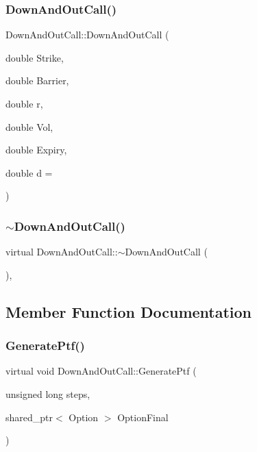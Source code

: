 \subsubsection{\texorpdfstring{Down\+And\+Out\+Call()}{DownAndOutCall()}}
{\footnotesize\ttfamily Down\+And\+Out\+Call\+::\+Down\+And\+Out\+Call (\begin{DoxyParamCaption}\item[{double}]{Strike,  }\item[{double}]{Barrier,  }\item[{double}]{r,  }\item[{double}]{Vol,  }\item[{double}]{Expiry,  }\item[{double}]{d = {} }\end{DoxyParamCaption})}

\hypertarget{classDownAndOutCall_a01a5a9897ef41a37c569187b6c263afb}{}\label{classDownAndOutCall_a01a5a9897ef41a37c569187b6c263afb} 
\subsubsection{\texorpdfstring{$\sim$\+Down\+And\+Out\+Call()}{~DownAndOutCall()}}
{\footnotesize\ttfamily virtual Down\+And\+Out\+Call\+::$\sim$\+Down\+And\+Out\+Call (\begin{DoxyParamCaption}{ }\end{DoxyParamCaption})\hspace{0.3cm}{\ttfamily [inline]}, {\ttfamily [virtual]}}



\subsection{Member Function Documentation}
\hypertarget{classDownAndOutCall_a378b557d728ed157db9d41ef39bb8abf}{}\label{classDownAndOutCall_a378b557d728ed157db9d41ef39bb8abf} 
\subsubsection{\texorpdfstring{Generate\+Ptf()}{GeneratePtf()}\hspace{0.1cm}{\footnotesize\ttfamily [1/2]}}
{\footnotesize\ttfamily virtual void Down\+And\+Out\+Call\+::\+Generate\+Ptf (\begin{DoxyParamCaption}\item[{unsigned long}]{steps,  }\item[{shared\+\_\+ptr$<$ Option $>$}]{Option\+Final }\end{DoxyParamCaption})\hspace{0.3cm}{\ttfamily [virtual]}}




